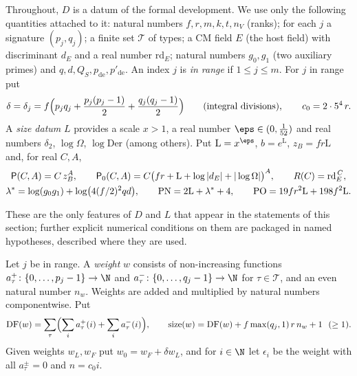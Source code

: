 \begin{definition}\label{pf:onto1:sizeq}
Throughout, $D$ is a datum of the formal development. We use only the following quantities attached to
it: natural numbers $f,r,m,k,t,n_V$ (ranks); for each $j$ a signature $(p_j,q_j)$; a finite set $\mathcal T$ of
types; a CM field $E$ (the host field) with discriminant $d_E$ and a real number $\mathrm{rd}_E$; natural
numbers $g_0,g_1$ (two auxiliary primes) and $q,d,Q_S,p_{\mathrm{de}},p'_{\mathrm{de}}$. An index $j$ is \emph{in
range} if $1\le j\le m$. For $j$ in range put
\[
\delta=\delta_j=f\Bigl(p_jq_j+\frac{p_j(p_j-1)}2+\frac{q_j(q_j-1)}2\Bigr)\qquad(\text{integral divisions}),
\qquad c_0=2\cdot5^4\,r .
\]
A \emph{size datum} $L$ provides a scale $x>1$, a real number $\eps\in(0,\tfrac1{52})$ and real numbers
$\delta_2$, $\log\Omega$, $\log\mathrm{Der}$ (among others). Put $\mathrm L=x^{\eps}$, $b=e^{\mathrm L}$, $z_B=fr\mathrm L$
and, for real $C,A$,
\begin{gather*}
\mathsf{P}(C,A)=C\,z_B^{A},\qquad \mathsf{P}_0(C,A)=C\bigl(fr+\mathrm L+\log|d_E|+|\log\Omega|\bigr)^{A},\qquad
R(C)=\mathrm{rd}_E^{\,C},\\
\lambda^*=\log(g_0g_1)+\log\bigl(4(f/2)^2qd\bigr),\qquad \mathrm{PN}=2\mathrm L+\lambda^*+4,\qquad
\mathrm{PO}=19fr^2\mathrm L+198f^2\mathrm L .
\end{gather*}
\end{definition}

These are the only features of $D$ and $L$ that appear in the statements of this section; further
explicit numerical conditions on them are packaged in named hypotheses, described where they are used.

\begin{definition}[Weights]\label{pf:onto1:weights}
Let $j$ be in range. A \emph{weight} $w$ consists of non-increasing functions
$a^+_\tau\colon\{0,\dots,p_j-1\}\to\N$ and $a^-_\tau\colon\{0,\dots,q_j-1\}\to\N$ for $\tau\in\mathcal T$, and an
even natural number $n_w$. Weights are added and multiplied by natural numbers componentwise. Put
\[
\operatorname{DF}(w)=\sum_{\tau}\Bigl(\sum_ia^+_\tau(i)+\sum_ia^-_\tau(i)\Bigr),\qquad
\operatorname{size}(w)=\operatorname{DF}(w)+f\max(q_j,1)\,r\,n_w+1\ \ (\ge1).
\]
Given weights $w_L,w_F$ put $w_0=w_F+\delta w_L$, and for $i\in\N$ let $\epsilon_i$ be the weight with all
$a^\pm_\tau=0$ and $n=c_0i$.
\end{definition}

